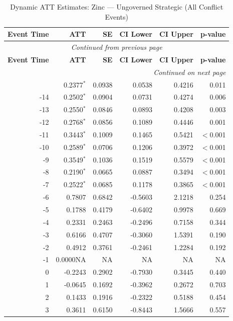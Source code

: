 \begin{longtable}{rrrrrr}
\caption{Dynamic ATT Estimates: Zinc --- Ungoverned Strategic (All Conflict Events)} \label{tab:zinc_all_conflict_events} \\
\toprule
\textbf{Event Time} & \textbf{ATT} & \textbf{SE} & \textbf{CI Lower} & \textbf{CI Upper} & \textbf{p-value} \\
\midrule
\endfirsthead
\multicolumn{6}{c}{\textit{Continued from previous page}} \\
\toprule
\textbf{Event Time} & \textbf{ATT} & \textbf{SE} & \textbf{CI Lower} & \textbf{CI Upper} & \textbf{p-value} \\
\midrule
\endhead
\midrule \multicolumn{6}{r}{\textit{Continued on next page}} \\
\endfoot
\bottomrule
\endlastfoot
-15 & 0.2377$^{*}$ & 0.0938 & 0.0538 & 0.4216 & 0.011 \\
-14 & 0.2502$^{*}$ & 0.0904 & 0.0731 & 0.4274 & 0.006 \\
-13 & 0.2550$^{*}$ & 0.0846 & 0.0893 & 0.4208 & 0.003 \\
-12 & 0.2768$^{*}$ & 0.0856 & 0.1089 & 0.4446 & 0.001 \\
-11 & 0.3443$^{*}$ & 0.1009 & 0.1465 & 0.5421 & $<$0.001 \\
-10 & 0.2589$^{*}$ & 0.0706 & 0.1206 & 0.3972 & $<$0.001 \\
-9 & 0.3549$^{*}$ & 0.1036 & 0.1519 & 0.5579 & $<$0.001 \\
-8 & 0.2190$^{*}$ & 0.0665 & 0.0887 & 0.3494 & $<$0.001 \\
-7 & 0.2522$^{*}$ & 0.0685 & 0.1178 & 0.3865 & $<$0.001 \\
-6 & 0.7807 & 0.6842 & -0.5603 & 2.1218 & 0.254 \\
-5 & 0.1788 & 0.4179 & -0.6402 & 0.9978 & 0.669 \\
-4 & 0.2331 & 0.2463 & -0.2496 & 0.7158 & 0.344 \\
-3 & 0.6166 & 0.4707 & -0.3060 & 1.5391 & 0.190 \\
-2 & 0.4912 & 0.3761 & -0.2461 & 1.2284 & 0.192 \\
-1 & 0.0000NA & NA & NA & NA & NA \\
0 & -0.2243 & 0.2902 & -0.7930 & 0.3445 & 0.440 \\
1 & -0.0645 & 0.1692 & -0.3962 & 0.2672 & 0.703 \\
2 & 0.1433 & 0.1916 & -0.2322 & 0.5188 & 0.454 \\
3 & 0.3611 & 0.6150 & -0.8443 & 1.5666 & 0.557 \\

\end{longtable}

